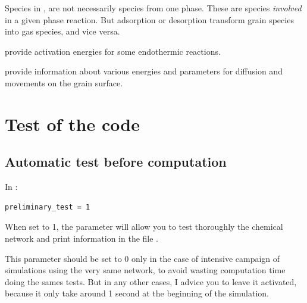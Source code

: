 \documentclass[english,a4paper,twoside]{article}
\begin{document}
\begin{remarque}
Species in ,  are not necessarily species from one phase. These are species \emph{involved} in a given phase reaction. But adsorption or desorption transform grain species into gas species, and vice versa. 
\end{remarque}

 provide activation energies for some endothermic reactions. 

 provide information about various energies and parameters for diffusion and movements on the grain surface.

\section{Test of the code}
\subsection{Automatic test before computation}
In : 
\begin{verbatim}
preliminary_test = 1
\end{verbatim}

When set to 1, the parameter  will allow you to test thoroughly the chemical network and print information in the file . 

\begin{remarque}
This parameter should be set to 0 only in the case of intensive campaign of simulations using the very same network, to avoid wasting computation time doing the sames tests. But in any other cases, I advice you to leave it activated, because it only take around 1 second at the beginning of the simulation.
\end{remarque}
\end{document}
